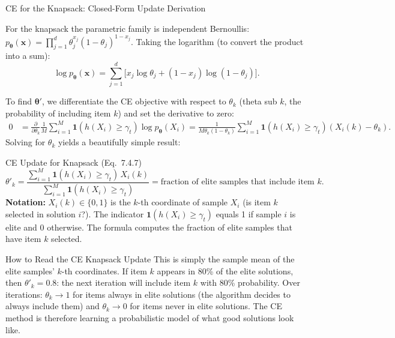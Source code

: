 \documentclass[aspectratio=169,10pt]{beamer}
\newcommand{\bx}{\mathbf{x}}
\newcommand{\btheta}{\boldsymbol{\theta}}
\begin{document}
\begin{frame}[allowframebreaks]{CE for the Knapsack: Closed-Form Update Derivation}

For the knapsack the parametric family is independent Bernoullis:
$p_{\btheta}(\bx) = \prod_{j=1}^d \theta_j^{x_j}(1-\theta_j)^{1-x_j}$.
Taking the logarithm (to convert the product into a sum):
\[
  \log p_{\btheta}(\bx) = \sum_{j=1}^d
  \bigl[x_j \log\theta_j + (1-x_j)\log(1-\theta_j)\bigr].
\]

To find $\btheta'$, we differentiate the CE objective with respect to
$\theta_k$ (theta sub $k$, the probability of including item $k$) and set
the derivative to zero:
\begin{align*}
  0 &= \frac{\partial}{\partial\theta_k}
    \frac{1}{M}\sum_{i=1}^M \mathbf{1}(h(X_i)\ge\gamma_t)\log p_{\btheta}(X_i)
  = \frac{1}{M\theta_k(1-\theta_k)}\sum_{i=1}^M
    \mathbf{1}(h(X_i)\ge\gamma_t)(X_i(k) - \theta_k).
\end{align*}
Solving for $\theta_k$ yields a beautifully simple result:

\begin{block}{CE Update for Knapsack (Eq.~7.4.7)}
  \[
    \theta'_k = \frac{\displaystyle\sum_{i=1}^M
      \mathbf{1}(h(X_i)\ge\gamma_t)\,X_i(k)}
             {\displaystyle\sum_{i=1}^M \mathbf{1}(h(X_i)\ge\gamma_t)}
    = \text{fraction of elite samples that include item } k.
  \]
  \textbf{Notation:} $X_i(k) \in \{0,1\}$ is the $k$-th coordinate of
  sample $X_i$ (is item $k$ selected in solution $i$?).  The indicator
  $\mathbf{1}(h(X_i)\ge\gamma_t)$ equals 1 if sample $i$ is elite and 0
  otherwise.  The formula computes the fraction of elite samples that have
  item $k$ selected.
\end{block}

\begin{alertblock}{How to Read the CE Knapsack Update}
  This is simply the sample mean of the elite samples' $k$-th coordinates.
  If item $k$ appears in 80\% of the elite solutions, then $\theta'_k = 0.8$:
  the next iteration will include item $k$ with 80\% probability.  Over
  iterations: $\theta_k \to 1$ for items always in elite solutions (the
  algorithm decides to always include them) and $\theta_k \to 0$ for items
  never in elite solutions.  The CE method is therefore learning a
  probabilistic model of what good solutions look like.
\end{alertblock}


\end{frame}
\end{document}
